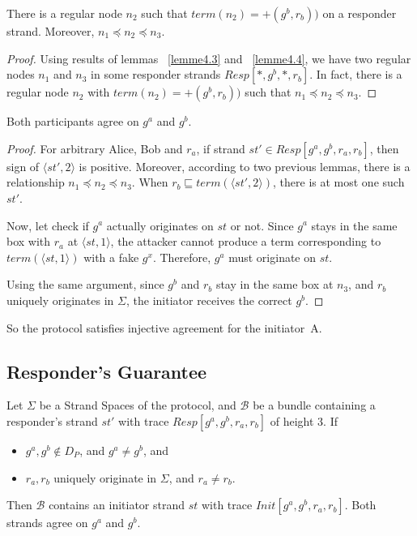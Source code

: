 \begin{itemize}
\begin{Lemma}\label{lemme4.5}
There is a regular node $n_2$ such that $term(n_2)= + (g^b,r_b))$ on a responder strand. Moreover, $n_1 \preceq n_2 \preceq n_3$.
\end{Lemma}

\begin{proof}
Using results of lemmas ~\ref{lemme4.3} and ~\ref{lemme4.4}, we have two regular nodes $n_1$ and $n_3$ in some responder strands $Resp[*,g^b,*,r_b]$. In fact, there is a regular node $n_2$ with $term(n_2)= + (g^b,r_b))$ such that $n_1 \preceq n_2 \preceq n_3$. 
\end{proof}

\begin{Lemma}\label{lemme4.6}
Both participants agree on $g^a$ and $g^b$. 
\end{Lemma}

\begin{proof}
For arbitrary Alice, Bob and $r_a$, if strand $st' \in Resp[g^a,g^b,r_a,r_b]$, then sign of $\langle st',2 \rangle$ is positive. Moreover, according to two previous lemmas, there is a relationship $n_1 \preceq n_2 \preceq n_3$. When $r_b \sqsubseteq term(\langle st',2 \rangle )$, there is at most one such $st'$.

Now, let check if $g^a$ actually originates on $st$ or not. Since $g^a$ stays in the same box with $r_a$ at $\langle st,1 \rangle$, the attacker cannot produce a term corresponding to $term(\langle st,1 \rangle )$ with a fake $g^{x}$. Therefore, $g^a$ must originate on $st$. 

Using the same argument, since $g^b$ and $r_b$ stay in the same box at $n_3$, and $r_b$ uniquely originates in $\Sigma$, the initiator receives the correct $g^b$.
\end{proof}

So the protocol satisfies injective agreement for the initiator~A. 


\subsection{Responder's Guarantee }

\begin{Proposition}
Let $\Sigma$ be a Strand Spaces of the protocol, and $\mathcal{B}$ be a bundle containing a responder's strand $st'$ with trace $Resp[g^a,g^b,r_a,r_b]$ of height 3. If
\begin{itemize}
\item $g^a,g^b \not\in D_P$, and $g^a \not= g^b$, and
\item $r_a,r_b$ uniquely originate in $\Sigma$, and $r_a \not= r_b$.
\end{itemize}
Then $\mathcal{B}$ contains an initiator strand $st$ with trace $Init[g^a,g^b,r_a,r_b]$. Both strands agree on $g^a$ and $g^b$.
\end{Proposition}


\end{itemize}
